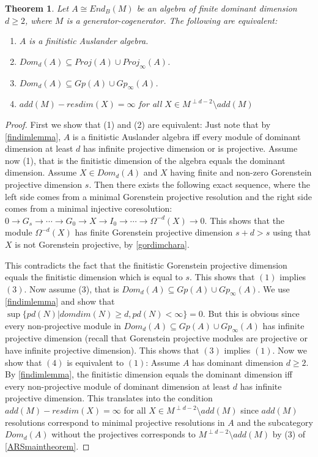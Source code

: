 \documentclass[a4paper]{amsart}
\newtheorem{theorem}{Theorem}[section]
\theoremstyle{definition}
\theoremstyle{remark}
\numberwithin{equation}{theorem}
\begin{document}
\begin{theorem} \label{maintheorem}
Let $A \cong End_B(M)$ be an algebra of finite dominant dimension $d \geq 2$, where $M$ is a generator-cogenerator.
The following are equivalent:
\begin{enumerate}
\item $A$ is a finitistic Auslander algebra.
\item $Dom_d(A) \subseteq Proj(A) \cup Proj_{\infty}(A)$.
\item $Dom_d(A) \subseteq Gp(A) \cup Gp_{\infty}(A)$.
\item $add(M)-resdim(X)= \infty$ for all $X \in M^{\perp d-2} \setminus add(M)$
\end{enumerate}
\end{theorem}
\begin{proof}
First we show that (1) and (2) are equivalent: Just note that by \ref{findimlemma}, $A$ is a finitistic Auslander algebra iff every module of dominant dimension at least $d$ has infinite projective dimension or is projective.
Assume now (1), that is the finitistic dimension of the algebra equals the dominant dimension. Assume $X \in Dom_d(A)$ and $X$ having finite and non-zero Gorenstein projective dimension $s$. Then there exists the following exact sequence, where the left side comes from a minimal Gorenstein projective resolution and the right side comes from a minimal injective coresolution: $0 \rightarrow G_s \rightarrow \cdots \rightarrow G_0 \rightarrow X \rightarrow I_0 \rightarrow \cdots \rightarrow \Omega^{-d}(X) \rightarrow 0 $. This shows that the module $\Omega^{-d}(X)$ has finite Gorenstein projective dimension $s+d>s$ using that $X$ is not Gorenstein projective, by \ref{gordimchara}.

This contradicts the fact that the finitistic Gorenstein projective dimension equals the finitistic dimension which is equal to $s$. This shows that $(1)$ implies $(3)$. \newline
Now assume (3), that is $Dom_d(A) \subseteq Gp(A) \cup Gp_{\infty}(A)$. We use \ref{findimlemma} and show that $\sup \{ pd(N) | domdim(N) \geq d , pd(N) < \infty \}=0$. But this is obvious since every non-projective module in $Dom_d(A) \subseteq Gp(A) \cup Gp_{\infty}(A)$ has infinite projective dimension (recall that Gorenstein projective modules are projective or have infinite projective dimension). This shows that $(3)$ implies $(1)$. \newline
Now we show that $(4)$ is equivalent to $(1)$: \newline
Assume $A$ has dominant dimension $d \geq 2$.
By \ref{findimlemma}, the finitistic dimension equals the dominant dimension iff every non-projective module of dominant dimension at least $d$ has infinite projective dimension. This translates into the condition $add(M)-resdim(X)= \infty$ for all $X \in M^{\perp d-2} \setminus add(M)$ since $add(M)$ resolutions correspond to minimal projective resolutions in $A$ and the subcategory $Dom_d(A)$ without the projectives corresponds to $M^{\perp d-2} \setminus add(M)$ by (3) of \ref{ARSmaintheorem}.
\end{proof}
\end{document}
